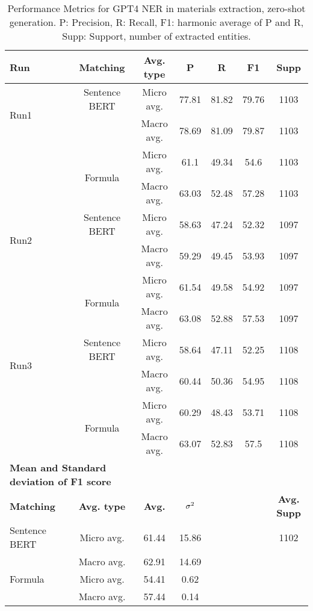 \begin{table}[htbp]
\small
  \centering
  \caption{Performance Metrics for GPT4 NER in materials extraction, zero-shot generation. P: Precision, R: Recall, F1: harmonic average of P and R, Supp: Support, number of extracted entities.}
  \begin{tabular}{lcccccc}
    \toprule
    \textbf{Run} & \textbf{Matching} & \textbf{Avg. type} & \textbf{P} & \textbf{R} & \textbf{F1} & \textbf{Supp} \\
    \midrule
    \multirow{2}{*}{Run1} & Sentence BERT & Micro avg. & 77.81 & 81.82 & 79.76 & 1103 \\
    & & Macro avg. & 78.69 & 81.09 & 79.87 & 1103 \\
    \cmidrule{2-7}
    & \multirow{2}{*}{Formula} & Micro avg. & 61.1 & 49.34 & 54.6 & 1103 \\
    & & Macro avg. & 63.03 & 52.48 & 57.28 & 1103 \\
    \midrule
    \multirow{2}{*}{Run2} & Sentence BERT & Micro avg. & 58.63 & 47.24 & 52.32 & 1097 \\
    & & Macro avg. & 59.29 & 49.45 & 53.93 & 1097 \\
    \cmidrule{2-7}
    & \multirow{2}{*}{Formula} & Micro avg. & 61.54 & 49.58 & 54.92 & 1097 \\
    & & Macro avg. & 63.08 & 52.88 & 57.53 & 1097 \\
    \midrule
    \multirow{2}{*}{Run3} & Sentence BERT & Micro avg. & 58.64 & 47.11 & 52.25 & 1108 \\
    & & Macro avg. & 60.44 & 50.36 & 54.95 & 1108 \\
    \cmidrule{2-7}
    & \multirow{2}{*}{Formula} & Micro avg. & 60.29 & 48.43 & 53.71 & 1108 \\
    & & Macro avg. & 63.07 & 52.83 & 57.5 & 1108 \\
    \midrule
    \multicolumn{2}{l}{\textbf{Mean and Standard deviation of F1 score}} & & & & & \\
    \midrule
    \textbf{Matching} & \textbf{Avg. type} & \textbf{Avg.} & $\sigma\textsuperscript{2}$ & & & \textbf{Avg. Supp}\\
    Sentence BERT & Micro avg. & 61.44 & 15.86 & & & 1102 \\
    & Macro avg. & 62.91 & 14.69 & & & \\
    Formula & Micro avg. & 54.41 & 0.62 & & & \\
    & Macro avg. & 57.44 & 0.14 & & & \\
    \bottomrule
  \end{tabular}
\end{table}

